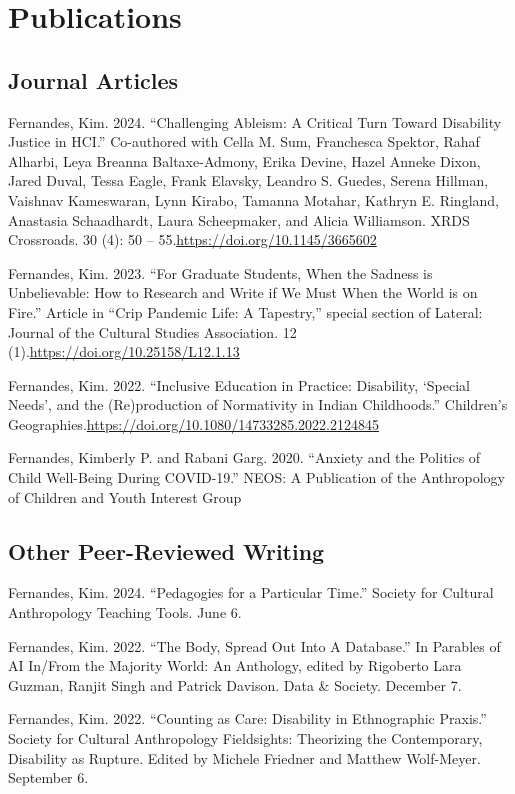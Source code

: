 \documentclass[11pt,letterpaper]{report}
\newcommand{\listitemspace}{0.25em}
\renewenvironment{itemize}{\begin{list}{}{\setlength{\leftmargin}{0em}\setlength{\parskip}{0em}\setlength{\itemsep}{\listitemspace}\setlength{\parsep}{\listitemspace}}}{\end{list}}
\begin{document}
    \section*{Publications}
    \subsection*{Journal Articles}
    \begin{itemize}
        \item Fernandes, Kim. 2024. “Challenging Ableism: A Critical Turn Toward Disability Justice in HCI.” Co-authored with Cella M. Sum, Franchesca Spektor, Rahaf Alharbi, Leya Breanna Baltaxe-Admony, Erika Devine, Hazel Anneke Dixon, Jared Duval, Tessa Eagle, Frank Elavsky, Leandro S. Guedes, Serena Hillman, Vaishnav Kameswaran, Lynn Kirabo, Tamanna Motahar, Kathryn E. Ringland, Anastasia Schaadhardt, Laura Scheepmaker, and Alicia Williamson. XRDS Crossroads. 30 (4): 50 – 55.\newline\href{https://doi.org/10.1145/3665602}{https://doi.org/10.1145/3665602}
        \item Fernandes, Kim. 2023. “For Graduate Students, When the Sadness is Unbelievable: How to Research and Write if We Must When the World is on Fire.” Article in “Crip Pandemic Life: A Tapestry,” special section of Lateral: Journal of the Cultural Studies Association. 12 (1).\newline\href{https://doi.org/10.25158/L12.1.13}{https://doi.org/10.25158/L12.1.13}
        \item Fernandes, Kim. 2022. “Inclusive Education in Practice: Disability, ‘Special Needs’, and the (Re)production of Normativity in Indian Childhoods.” Children’s Geographies.\newline\href{https://doi.org/10.1080/14733285.2022.2124845}{https://doi.org/10.1080/14733285.2022.2124845}
        \item Fernandes, Kimberly P. and Rabani Garg. 2020. “Anxiety and the Politics of Child Well-Being During COVID-19.” NEOS: A Publication of the Anthropology of Children and Youth Interest Group
    \end{itemize}
    \subsection*{Other Peer-Reviewed Writing}
    \begin{itemize}
        \item Fernandes, Kim. 2024. “Pedagogies for a Particular Time.” Society for Cultural Anthropology Teaching Tools. June 6.
        \item Fernandes, Kim. 2022. “The Body, Spread Out Into A Database.” In Parables of AI In/From the Majority World: An Anthology, edited by Rigoberto Lara Guzman, Ranjit Singh and Patrick Davison. Data \& Society. December 7.
        \item Fernandes, Kim. 2022. “Counting as Care: Disability in Ethnographic Praxis.” Society for Cultural Anthropology Fieldsights: Theorizing the Contemporary, Disability as Rupture. Edited by Michele Friedner and Matthew Wolf-Meyer. September 6.
    \end{itemize}
\end{document}
